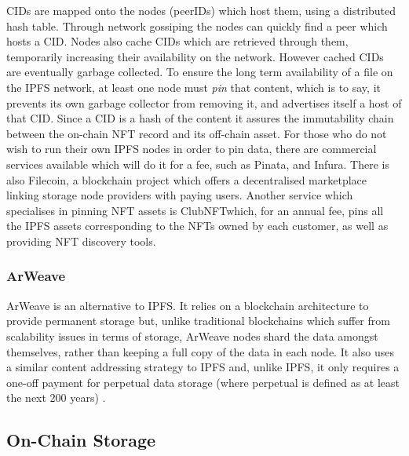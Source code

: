 CIDs are mapped onto the nodes (peerIDs) which host them, using a \gls{distributed hash table}. Through network gossiping the nodes can quickly find a peer which hosts a CID. Nodes also cache CIDs which are retrieved through them, temporarily increasing their availability on the network.
However cached CIDs are eventually garbage collected. To ensure the long term availability of a file on the IPFS network, at least one node must \emph{pin} that content, which is to say, it prevents its own garbage collector from removing it, and advertises itself a host of that CID.
Since a CID is a hash of the content it assures the immutability chain between the on-chain NFT record and its off-chain asset.
For those who do not wish to run their own IPFS nodes in order to pin data, there are commercial services available which will do it for a fee, such as Pinata\footnotemark[9], and Infura\footnotemark[10]. There is also Filecoin\footnotemark[11], a blockchain project which offers a decentralised marketplace linking storage node providers with paying users. Another service which specialises in pinning NFT assets is ClubNFT\footnotemark[12] which, for an annual fee, pins all the IPFS assets corresponding to the NFTs owned by each customer, as well as providing NFT discovery tools.


\subsubsection{ArWeave}
\label{sec:arweave}

ArWeave is an alternative to IPFS. It relies on a blockchain architecture to provide permanent storage but, unlike traditional blockchains which suffer from scalability issues in terms of storage, ArWeave nodes shard the data amongst themselves, rather than keeping a full copy of the data in each node.
It also uses a similar content addressing strategy to IPFS and, unlike IPFS, it only requires a one-off payment for perpetual data storage (where perpetual is defined as at least the next 200 years) \cite{williamsArweaveProtocolEconomically2019}.

\subsection{On-Chain Storage}

